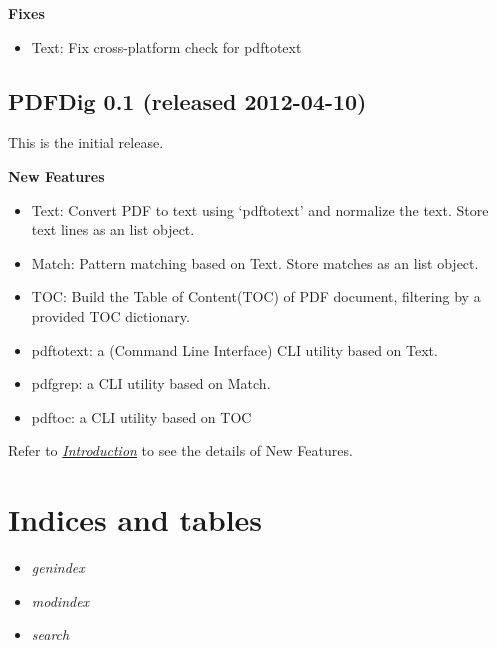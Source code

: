 \documentclass[letterpaper,10pt,oneside]{sphinxmanual}
\begin{document}
\textbf{Fixes}
\begin{itemize}
\item {} 
Text: Fix cross-platform check for pdftotext

\end{itemize}


\section{PDFDig 0.1 (released 2012-04-10)}
\label{release:pdfdig-0-1-released-2012-04-10}
This is the initial release.

\textbf{New Features}
\begin{itemize}
\item {} 
Text: Convert PDF to text using `pdftotext' and normalize the text. Store text lines as an list object.

\item {} 
Match: Pattern matching based on Text. Store matches as an list object.

\item {} 
TOC: Build the Table of Content(TOC) of PDF document, filtering by a provided TOC dictionary.

\item {} 
pdftotext: a (Command Line Interface) CLI utility based on Text.

\item {} 
pdfgrep: a CLI utility based on Match.

\item {} 
pdftoc: a CLI utility based on TOC

\end{itemize}

Refer to {\hyperref[intro::doc]{\emph{Introduction}}} to see the details of New Features.


\chapter{Indices and tables}
\label{index:indices-and-tables}\begin{itemize}
\item {} 
\emph{genindex}

\item {} 
\emph{modindex}

\item {} 
\emph{search}

\end{itemize}



\renewcommand{\indexname}{Index}
\printindex
\end{document}

